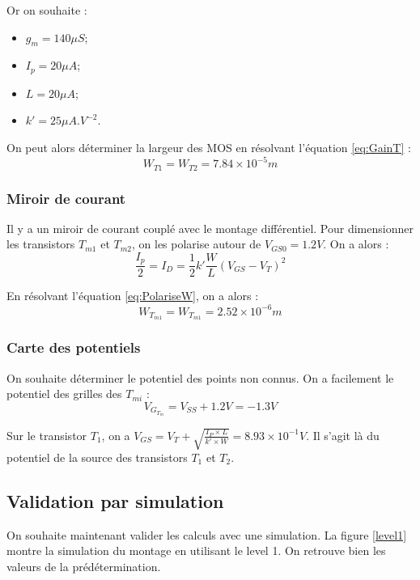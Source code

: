 \documentclass[french]{article}
\begin{document}
Or on souhaite :
\begin{itemize}
	\item $g_m = 140 \mu S$;
	\item $I_p = 20 \mu A$;
	\item $L = 20 \mu A$;
	\item $k' = 25 \mu A . V^{-2}$.
\end{itemize}

On peut alors déterminer la largeur des MOS en résolvant l'équation \ref{eq:GainT} :
\[
\boxed{W_{T1} = W_{T2} = 7.84 \times 10^{-5} m}
\]

\subsubsection{ Miroir de courant}

Il y a un miroir de courant couplé avec le montage différentiel. Pour dimensionner les transistors $T_{m1}$ et $T_{m2}$, on les polarise autour de $V_{GS0}=1.2V$. On a alors :
\begin{equation}
  \frac{I_p}{2} = I_D = \frac{1}{2} k' \frac{W}{L} (V_{GS} - V_T)^2 \label{eq:PolariseW}
\end{equation}

En résolvant l'équation \ref{eq:PolariseW}, on a alors :
\[
\boxed{W_{T_{m1}} = W_{T_{m1}} =  2.52 \times 10^{-6} m}
\]

\subsubsection{ Carte des potentiels}

On souhaite déterminer le potentiel des points non connus. On a facilement le potentiel des grilles des $T_{mi}$ :
\[
V_{G_{T_m}} = V_{SS} + 1.2V = -1.3V
\]

Sur le transistor $T_1$, on a $V_{GS} = V_T + \sqrt{\frac{I_P \times L}{k' \times W}} = 8.93 \times 10 ^ {-1} V$. Il s'agit là du potentiel de la source des transistors $T_1$ et $T_2$.

\subsection{ Validation par simulation}

On souhaite maintenant valider les calculs avec une simulation. La figure \ref{level1} montre la simulation du montage en utilisant le level 1. On retrouve bien les valeurs de la prédétermination.
\end{document}
